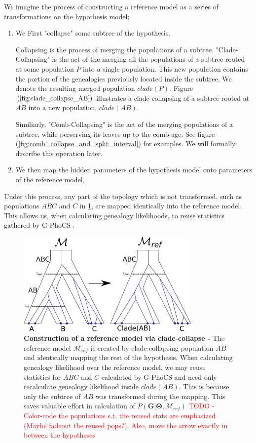 \documentclass[11pt]{article}
\newcommand{\vect}[1]{\boldsymbol{\mathbf{#1}}}
\newcommand{\M}{\mathcal{M}}
\newcommand{\G}{\vect{G}}
\newcommand{\T}{\vect{\Theta}}
\newcommand{\Mref}{\M_{ref}}
\newcommand{\1}{\mathbbm{1}}
\newcommand{\gp}{G-PhoCS }
\begin{document}
We imagine the process of constructing a reference model as a series of transformations on the hypothesis model; 
\begin{enumerate}
\item We First "collapse" some subtree of the hypothesis. 

Collapsing is the process of merging the populations of a subtree. "Clade-Collapsing" is the act of the merging all the populations of a subtree rooted at some population $P$ into a single population. This new population contains the portion of the genealogies previously located inside the subtree. We denote the resulting merged population $clade(P)$. Figure $(\ref{fig:clade_collapse_AB})$ illustrates a clade-collapsing of a subtree rooted at $AB$ into a new population, $clade(AB)$. 

Similiarly, "Comb-Collapsing" is the act of the merging populations of a subtree, while perserving its leaves up to the comb-age. 
See figure (\ref{fig:comb_collapse_and_split_interval}) for examples. We will formally describe this operation later.


\item We then map the hidden parameters of the hypothesis model onto parameters of the reference model.
\end{enumerate}

Under this process, any part of the topology which is not transformed, such as populations $ABC$ and $C$ in \ref{fig:clade_collapse_AB}, are mapped identically into the reference model. This allows us, when calculating genealogy likelihoods, to reuse statistics gathered by \gp.

\begin{figure}[h]
\centering
\includegraphics[width=0.8\textwidth]
{clade_collapse_AB}
\caption{\textbf{Construction of a reference model via clade-collapse - } The reference model  $\Mref$ is created by clade-collapsing population $AB$ and identically mapping the rest of the hypothesis. When calculating genealogy likelihood over the reference model, we may reuse statistics for $ABC$ and $C$ calculated by \gp and need only recalculate genealogy likelihood inside $clade(AB)$. This is because only the subtree of $AB$ was transformed during the mapping. This saves valuable effort in calculation of $P(\G|\T,\Mref)$ \textcolor{red}{TODO - Color-code the populations s.t. the reused stats are emphasized (Maybe fadeout the reused pops?). Also, move the arrow exactly in between the hypotheses}}
\label{fig:clade_collapse_AB}
\end{figure}
\end{document}
